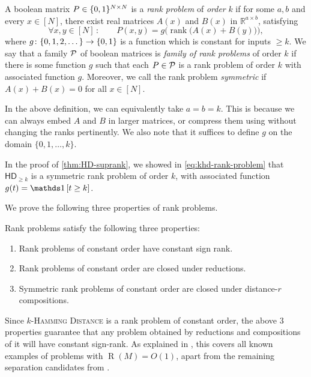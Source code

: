 \documentclass[conference]{IEEEtran}
\DeclareMathOperator{\Rand}{R}
\DeclareMathOperator{\rank}{rank}
\newcommand{\HD}[1]{\mathsf{HD}_{#1}}
\newcommand{\R}{\mathbb{R}}
\begin{document}
\begin{definition} \label{def:rank-problem}
A boolean matrix $P \in \{0,1\}^{N \times N}$ is a \emph{rank problem} of
\emph{order} $k$ if for some $a,b$ and every $x \in [N]$, there exist real matrices $A(x)$ and $B(x)$ in $\R^{a\times b}$, satisfying
\[
	\forall x,y\in[N]\,\colon\qquad P(x,y) = g\Big(\rank\!\big(A(x) + B(y)\big)\Big),
\]
where $g \colon \{0,1,2,\dots\} \to
\{0,1\}$ is a function which is constant for inputs $\geq k$. 
We say that a family $\mathcal{P}$ of boolean matrices is \emph{family of rank problems} of
order $k$ if there is some function $g$ such that
each $P \in \mathcal{P}$ is a rank problem of order $k$ with associated function $g$. Moreover, we call the rank problem \emph{symmetric} if $A(x) + B(x) = 0$ for all $x \in [N]$.
\end{definition}

\begin{remark}\label{rem:rank-domain}
	In the above definition, we can equivalently take $a = b = k$. This is because we can always embed $A$ and $B$ in larger matrices, or compress them using  without changing the ranks pertinently. We also note that it suffices to define $g$ on the domain $\{0,1,\dots, k\}$.
\end{remark}

\begin{example}\label{ex:HD-rank-problem}
In the proof of \cref{thm:HD-suprank}, we showed in \cref{eq:khd-rank-problem} that
$\HD{\geq k}$ is a symmetric rank problem of order $k$, with associated function $g(t) =
\ind{t \geq k}$.
\end{example}

We prove the following three properties of rank problems.

\begin{theorem}\label{thm:rank-problem-main}
	Rank problems satisfy the following three properties:
	\begin{enumerate}
		\item Rank problems of constant order have constant sign rank.
		\item Rank problems of constant order are closed under reductions.
		\item Symmetric rank problems of constant order are closed under distance-$r$ compositions.
	\end{enumerate}
\end{theorem}

Since \textsc{$k$-Hamming Distance} is a rank problem of constant order, the
above 3 properties guarantee that any problem obtained by reductions and
compositions of it will have constant sign-rank. As explained in \cite{FGHH25},
this covers all known examples of problems with $\Rand(M) = O(1)$, apart from the remaining separation candidates from \cite{SS24}.
\end{document}
